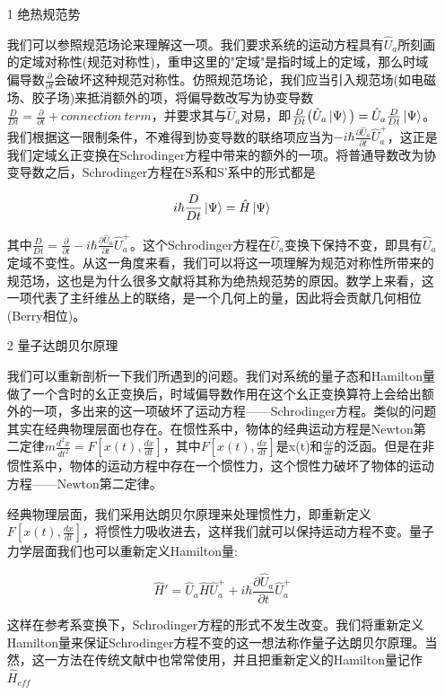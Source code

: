 \documentclass[a4paper]{article}
\begin{document}
        \begin{itemize}
        \item[1] 绝热规范势 
            
            我们可以参照规范场论来理解这一项。我们要求系统的运动方程具有$\hat{U}_a$所刻画的定域对称性(规范对称性)，重申这里的"定域"是指时域上的定域，那么时域偏导数$\frac{\partial}{\partial t}$会破坏这种规范对称性。仿照规范场论，我们应当引入规范场(如电磁场、胶子场)来抵消额外的项，将偏导数改写为协变导数$\frac{D}{Dt}=\frac{\partial}{\partial t}+connection\ term$，并要求其与$\hat{U}_a$对易，即$\frac{D}{Dt}\big(\hat{U}_a\ket{\Psi}\big)=\hat{U}_a\frac{D}{Dt}\ket{\Psi}$。我们根据这一限制条件，不难得到协变导数的联络项应当为$-i\hbar\frac{\partial\hat{U}_a}{\partial t}\hat{U}_a^+$，这正是我们定域幺正变换在Schrodinger方程中带来的额外的一项。将普通导数改为协变导数之后，Schrodinger方程在S系和S'系中的形式都是

            \begin{equation}
                i\hbar\frac{D}{Dt}\ket{\Psi} = \hat{H}\ket{\Psi}
            \end{equation}

            其中$\frac{D}{Dt}=\frac{\partial}{\partial t}-i\hbar\frac{\partial\hat{U}_a}{\partial t}\hat{U}_a^+$。这个Schrodinger方程在$\hat{U}_a$变换下保持不变，即具有$\hat{U}_a$定域不变性。从这一角度来看，我们可以将这一项理解为规范对称性所带来的规范场，这也是为什么很多文献将其称为绝热规范势的原因。数学上来看，这一项代表了主纤维丛上的联络，是一个几何上的量，因此将会贡献几何相位(Berry相位)。
        
        \item[2] 量子达朗贝尔原理
            
            我们可以重新剖析一下我们所遇到的问题。我们对系统的量子态和Hamilton量做了一个含时的幺正变换后，时域偏导数作用在这个幺正变换算符上会给出额外的一项，多出来的这一项破坏了运动方程——Schrodinger方程。类似的问题其实在经典物理层面也存在。在惯性系中，物体的经典运动方程是Newton第二定律$m\frac{d^2x}{dt^2}=F[x(t),\frac{dx}{dt}]$，其中$F[x(t),\frac{dx}{dt}]$是x(t)和$\frac{dx}{dt}$的泛函。但是在非惯性系中，物体的运动方程中存在一个惯性力，这个惯性力破坏了物体的运动方程——Newton第二定律。

            经典物理层面，我们采用达朗贝尔原理来处理惯性力，即重新定义$F[x(t),\frac{dx}{dt}]$，将惯性力吸收进去，这样我们就可以保持运动方程不变。量子力学层面我们也可以重新定义Hamilton量:
            
            \begin{equation}
                \hat{H}'=\hat{U}_a\hat{H}\hat{U}_a^+ + i\hbar\frac{\partial\hat{U}_a}{\partial t}\hat{U}_a^+
            \end{equation}

            这样在参考系变换下，Schrodinger方程的形式不发生改变。我们将重新定义Hamilton量来保证Schrodinger方程不变的这一想法称作量子达朗贝尔原理。当然，这一方法在传统文献中也常常使用，并且把重新定义的Hamilton量记作$\hat{H}_{eff}$
            
        \end{itemize}
\end{document}
